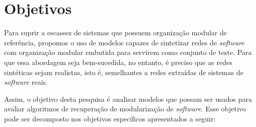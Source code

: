 \documentclass[12pt]{article}
\begin{document}



\section{Objetivos}

Para suprir a escassez de sistemas que possuem organização modular de
referência, propomos o uso de modelos capazes de sintetizar redes de
\emph{software} com organização modular embutida para servirem como conjunto de
teste. Para que essa abordagem seja bem-sucedida, no entanto, é preciso que as
redes sintéticas sejam realistas, isto é, semelhantes a redes extraídas de
sistemas de \emph{software} reais. 

Assim, o objetivo desta pesquisa é analisar modelos que possam ser
usados para avaliar algoritmos de recuperação de modularização de
\emph{software}. Esse objetivo pode ser decomposto nos objetivos específicos
apresentados a seguir:
\end{document}
